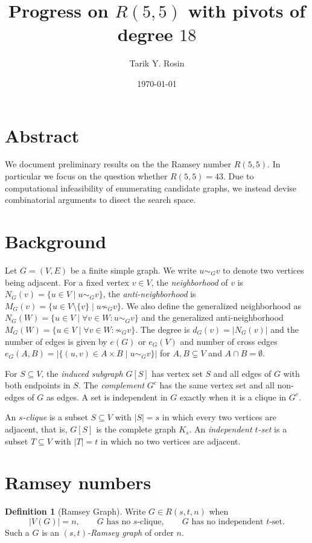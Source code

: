 \documentclass[a4paper]{article}
\title{Progress on $R(5, 5)$ with pivots of degree $18$}
\author{Tarik Y. Rosin}
\date{\today}
\theoremstyle{definition}
\newtheorem{definition}{Definition}
\begin{document}
\maketitle

\section*{Abstract}

We document preliminary results on the the Ramsey number $R(5, 5)$.
In particular we focus on the question whether $R(5, 5) = 43$.
Due to computational infeasibility of enumerating candidate graphs,
we instead devise combinatorial arguments to disect the search space.

\section{Background}

Let $G = (V, E)$ be a finite simple graph.
We write $u \sim_G v$ to denote two vertices being adjacent.
For a fixed vertex $v \in V$, the \emph{neighborhood} of $v$ is $N_G(v) = \{u \in V \mid u \sim_G v\}$,
the \emph{anti-neighborhood} is $M_G(v) = \{u \in V \setminus \{ v \} \mid u \not\sim_G v \}$.
We also define the generalized neighborhood as $N_G(W) = \{ u \in V \mid \forall v \in W \colon u \sim_G v \}$
and the generalized anti-neighborhood $M_G(W) = \{ u \in V \mid \forall v \in W \colon \not\sim_G v\}$.
The degree is $d_G(v) = |N_G(v)|$ and the number of edges is given by $e(G)$ or $e_G(V)$
and number of cross edges $e_G(A, B) = |\{ (u,v) \in A \times B \mid u \sim_G v \}|$ for $A, B \subsetneq V$ and $A \cap B = \emptyset$.


For $S \subseteq V$, the \emph{induced subgraph} $G[S]$ has vertex set $S$
and all edges of $G$ with both endpoints in $S$. The \emph{complement}
$G^c$ has the same vertex set and all non-edges of $G$ as edges.
A set is independent in $G$ exactly when it is a clique in $G^c$.

An \emph{$s$-clique} is a subset $S \subseteq V$ with $|S| = s$ in which
every two vertices are adjacent, that is, $G[S]$ is the complete graph
$K_s$. An \emph{independent $t$-set} is a subset $T \subseteq V$ with
$|T| = t$ in which no two vertices are adjacent.

\section{Ramsey numbers}

\begin{definition}[Ramsey Graph]
	Write $G \in R(s,t,n)$ when
	\[
		|V(G)| = n, \qquad G \text{ has no } s\text{-clique}, \qquad
		G \text{ has no independent } t\text{-set}.
	\]
	Such a $G$ is an \emph{$(s,t)$-Ramsey graph} of order $n$.
\end{definition}
\end{document}
